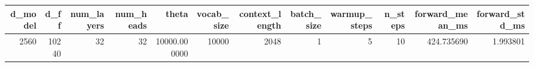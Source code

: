 \begin{tabular}{rrrrrrrrrrrr}
\toprule
d_model & d_ff & num_layers & num_heads & theta & vocab_size & context_length & batch_size & warmup_steps & n_steps & forward_mean_ms & forward_std_ms \\
\midrule
2560 & 10240 & 32 & 32 & 10000.000000 & 10000 & 2048 & 1 & 5 & 10 & 424.735690 & 1.993801 \\
\bottomrule
\end{tabular}
